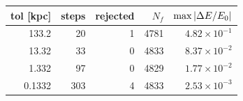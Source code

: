 \begin{tabular}{rrrrr}
\toprule
tol [kpc] & steps & rejected & $N_f$ & $\max\left|\Delta E/E_0\right|$ \\
\midrule
133.2 & 20 & 1 & 4781 & $4.82\times10^{-1}$ \\
13.32 & 33 & 0 & 4833 & $8.37\times10^{-2}$ \\
1.332 & 97 & 0 & 4829 & $1.77\times10^{-2}$ \\
0.1332 & 303 & 4 & 4833 & $2.53\times10^{-3}$ \\
\bottomrule
\end{tabular}
